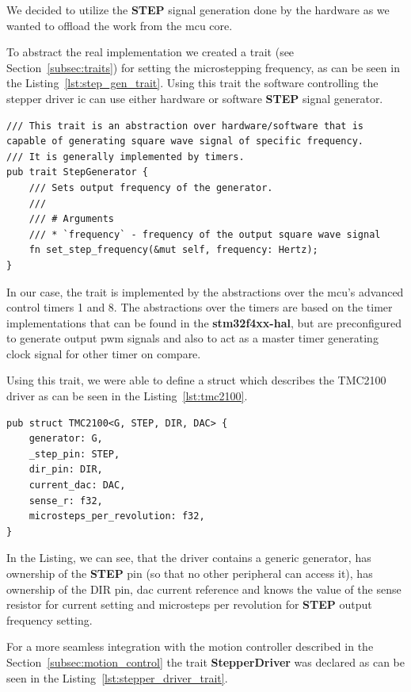 We decided to utilize the \textbf{STEP} signal generation done by the hardware as we wanted to offload the work from the \acs{mcu} core.

To abstract the real implementation we created a trait (see Section~\ref{subsec:traits}) for setting the microstepping frequency, as can be seen in the Listing~\ref{lst:step_gen_trait}.
Using this trait the software controlling the stepper driver \acs{ic} can use either hardware or software \textbf{STEP} signal generator.

\begin{lstlisting}[caption={Trait for abstracting STEP generation.},label=lst:step_gen_trait]
/// This trait is an abstraction over hardware/software that is capable of generating square wave signal of specific frequency.
/// It is generally implemented by timers.
pub trait StepGenerator {
    /// Sets output frequency of the generator.
    ///
    /// # Arguments
    /// * `frequency` - frequency of the output square wave signal
    fn set_step_frequency(&mut self, frequency: Hertz);
}
\end{lstlisting}

In our case, the trait is implemented by the abstractions over the \acs{mcu}'s advanced control timers 1 and 8.
The abstractions over the timers are based on the timer implementations that can be found in the \textbf{stm32f4xx-hal}, but are preconfigured to generate output \acs{pwm} signals and also to act as a master timer generating clock signal for other timer on compare.

Using this trait, we were able to define a struct which describes the TMC2100 driver as can be seen in the Listing~\ref{lst:tmc2100}.

\begin{lstlisting}[caption={TMC2100 driver.},label=lst:tmc2100]
pub struct TMC2100<G, STEP, DIR, DAC> {
    generator: G,
    _step_pin: STEP,
    dir_pin: DIR,
    current_dac: DAC,
    sense_r: f32,
    microsteps_per_revolution: f32,
}
\end{lstlisting}
In the Listing, we can see, that the driver contains a generic generator, has ownership of the \textbf{STEP} pin (so that no other peripheral can access it), has ownership of the \acs{DIR} pin, \acs{dac} current reference and knows the value of the sense resistor for current setting and microsteps per revolution for \textbf{STEP} output frequency setting.

For a more seamless integration with the motion controller described in the Section~\ref{subsec:motion_control} the trait \textbf{StepperDriver} was declared as can be seen in the Listing~\ref{lst:stepper_driver_trait}.

